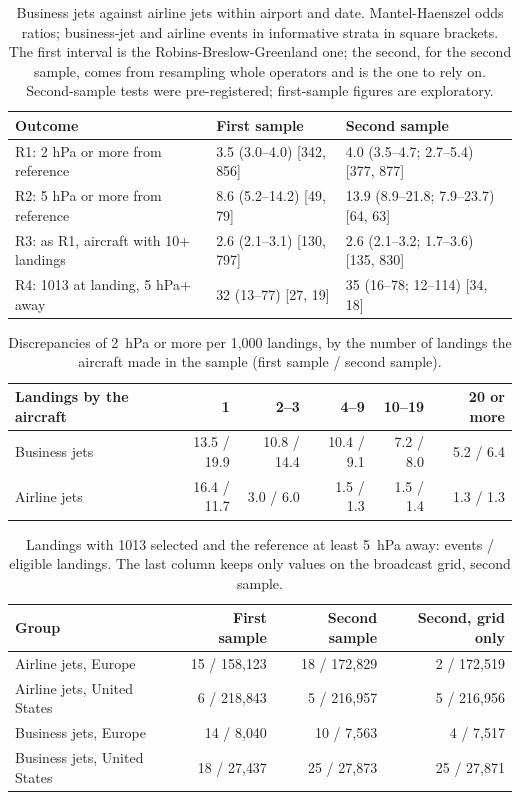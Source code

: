 \documentclass[11pt]{article}
\begin{document}
\begin{table}[ht]
\centering
\caption{Business jets against airline jets within airport and date. Mantel-Haenszel odds ratios; business-jet and airline events in informative strata in square brackets. The first interval is the Robins-Breslow-Greenland one; the second, for the second sample, comes from resampling whole operators and is the one to rely on. Second-sample tests were pre-registered; first-sample figures are exploratory.}\label{tab:b-or}
\footnotesize\setlength{\tabcolsep}{4pt}
\begin{tabular}{lll}
\toprule
Outcome & First sample & Second sample \\
\midrule
R1: 2 hPa or more from reference & 3.5 (3.0--4.0) [342, 856] & 4.0 (3.5--4.7; 2.7--5.4) [377, 877] \\
R2: 5 hPa or more from reference & 8.6 (5.2--14.2) [49, 79] & 13.9 (8.9--21.8; 7.9--23.7) [64, 63] \\
R3: as R1, aircraft with 10+ landings & 2.6 (2.1--3.1) [130, 797] & 2.6 (2.1--3.2; 1.7--3.6) [135, 830] \\
R4: 1013 at landing, 5 hPa+ away & 32 (13--77) [27, 19] & 35 (16--78; 12--114) [34, 18] \\
\bottomrule
\end{tabular}
\end{table}

\begin{table}[ht]
\centering
\caption{Discrepancies of 2~hPa or more per 1{,}000 landings, by the number of landings the aircraft made in the sample (first sample / second sample).}\label{tab:b-util}
\begin{tabular}{lrrrrr}
\toprule
Landings by the aircraft & 1 & 2--3 & 4--9 & 10--19 & 20 or more \\
\midrule
Business jets & 13.5 / 19.9 & 10.8 / 14.4 & 10.4 / 9.1 & 7.2 / 8.0 & 5.2 / 6.4 \\
Airline jets & 16.4 / 11.7 & 3.0 / 6.0 & 1.5 / 1.3 & 1.5 / 1.4 & 1.3 / 1.3 \\
\bottomrule
\end{tabular}
\end{table}

\begin{table}[ht]
\centering
\caption{Landings with 1013 selected and the reference at least 5~hPa away: events / eligible landings. The last column keeps only values on the broadcast grid, second sample.}\label{tab:b-std}
\begin{tabular}{lrrr}
\toprule
Group & First sample & Second sample & Second, grid only \\
\midrule
Airline jets, Europe & 15 / 158{,}123 & 18 / 172{,}829 & 2 / 172{,}519 \\
Airline jets, United States & 6 / 218{,}843 & 5 / 216{,}957 & 5 / 216{,}956 \\
Business jets, Europe & 14 / 8{,}040 & 10 / 7{,}563 & 4 / 7{,}517 \\
Business jets, United States & 18 / 27{,}437 & 25 / 27{,}873 & 25 / 27{,}871 \\
\bottomrule
\end{tabular}
\end{table}
\end{document}
